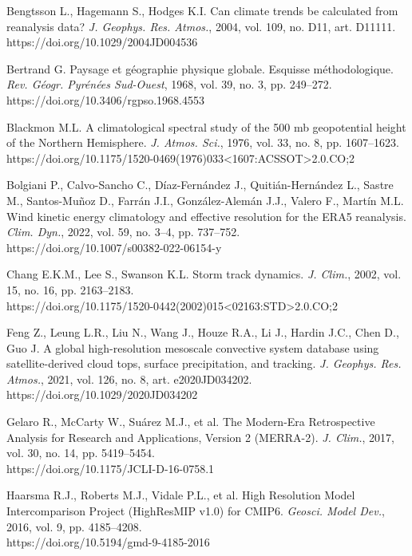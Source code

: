 \documentclass[12pt,a4paper]{article}
\begin{document}
\noindent Bengtsson L., Hagemann S., Hodges K.I. Can climate trends be calculated from reanalysis data? \textit{J. Geophys. Res. Atmos.}, 2004, vol. 109, no. D11, art. D11111.\\ https://doi.org/10.1029/2004JD004536

\noindent Bertrand G. Paysage et géographie physique globale. Esquisse méthodologique. \textit{Rev. Géogr. Pyrénées Sud-Ouest}, 1968, vol. 39, no. 3, pp. 249–272.\\ https://doi.org/10.3406/rgpso.1968.4553

\noindent Blackmon M.L. A climatological spectral study of the 500 mb geopotential height of the Northern Hemisphere. \textit{J. Atmos. Sci.}, 1976, vol. 33, no. 8, pp. 1607–1623.\\ https://doi.org/10.1175/1520-0469(1976)033<1607:ACSSOT>2.0.CO;2

\noindent Bolgiani P., Calvo-Sancho C., Díaz-Fernández J., Quitián-Hernández L., Sastre M., Santos-Muñoz D., Farrán J.I., González-Alemán J.J., Valero F., Martín M.L. Wind kinetic energy climatology and effective resolution for the ERA5 reanalysis. \textit{Clim. Dyn.}, 2022, vol. 59, no. 3–4, pp. 737–752.\\ https://doi.org/10.1007/s00382-022-06154-y

\noindent Chang E.K.M., Lee S., Swanson K.L. Storm track dynamics. \textit{J. Clim.}, 2002, vol. 15, no. 16, pp. 2163–2183.\\ https://doi.org/10.1175/1520-0442(2002)015<02163:STD>2.0.CO;2

\noindent Feng Z., Leung L.R., Liu N., Wang J., Houze R.A., Li J., Hardin J.C., Chen D., Guo J. A global high-resolution mesoscale convective system database using satellite-derived cloud tops, surface precipitation, and tracking. \textit{J. Geophys. Res. Atmos.}, 2021, vol. 126, no. 8, art. e2020JD034202.\\ https://doi.org/10.1029/2020JD034202

\noindent Gelaro R., McCarty W., Suárez M.J., et al. The Modern-Era Retrospective Analysis for Research and Applications, Version 2 (MERRA-2). \textit{J. Clim.}, 2017, vol. 30, no. 14, pp. 5419–5454.\\ https://doi.org/10.1175/JCLI-D-16-0758.1

\noindent Haarsma R.J., Roberts M.J., Vidale P.L., et al. High Resolution Model Intercomparison Project (HighResMIP v1.0) for CMIP6. \textit{Geosci. Model Dev.}, 2016, vol. 9, pp. 4185–4208.\\ https://doi.org/10.5194/gmd-9-4185-2016
\end{document}
